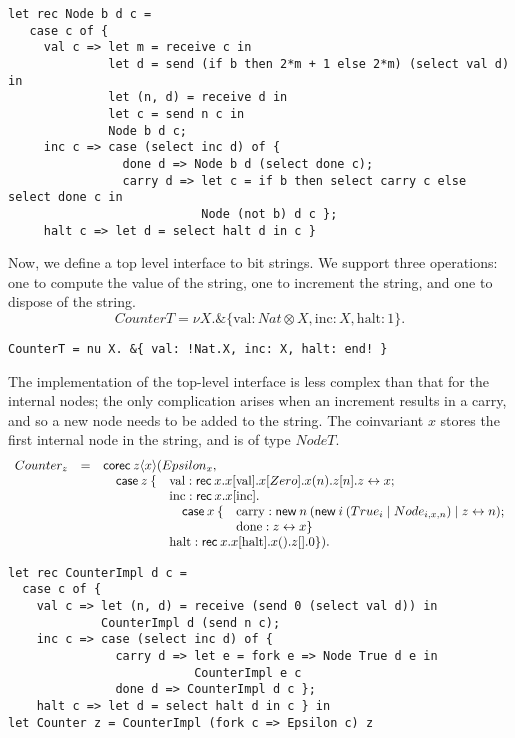 \documentclass[orivec,envcountsame]{llncs}
\newcommand{\with}{\mathbin\binampersand}
\newcommand{\mkwd}[1]{\mathsf{#1}}
\newcommand{\link}[2]{#1 \leftrightarrow #2}
\newcommand{\cut}[4]{\mkwd{new}\:#1 \: (#3 \mid #4)}
\newcommand{\rec}[1]{\mkwd{rec}\:#1}
\newcommand{\clabel}[1]{\mathrm{#1}}
\newcommand{\sel}[2]{#1[\clabel{#2}]}
\begin{document}
\begin{verbatim}
let rec Node b d c =
   case c of {
     val c => let m = receive c in
              let d = send (if b then 2*m + 1 else 2*m) (select val d) in
              let (n, d) = receive d in
              let c = send n c in
              Node b d c;
     inc c => case (select inc d) of {
                done d => Node b d (select done c);
                carry d => let c = if b then select carry c else select done c in
                           Node (not b) d c };
     halt c => let d = select halt d in c }
\end{verbatim}

Now, we define a top level interface to bit strings.  We support three operations: one to compute
the value of the string, one to increment the string, and one to dispose of the string.
%
{\small\[
 CounterT = \nu X. \with \{ \clabel{val}: Nat \otimes X, \clabel{inc}:X, \clabel{halt}:1 \}.
\]}

\begin{verbatim}
CounterT = nu X. &{ val: !Nat.X, inc: X, halt: end! }
\end{verbatim}

The implementation of the top-level interface is less complex than that for the internal nodes; the
only complication arises when an increment results in a carry, and so a new node needs to be added
to the string.  The coinvariant $x$ stores the first internal node in the string, and is of type
$NodeT$.
%
{\small\[\begin{array}{rclll}
  Counter_z & = & \multicolumn{3}{l}{\mkwd{corec}\:z \langle x \rangle (Epsilon_x,} \\
  & & \quad \mkwd{case}\:z\:\{ &\multicolumn{2}{l}{\clabel{val}: \rec{x}.\sel{x}{val}.x[Zero].x(n).z[n].\link{z}{x};} \\
  & & &  \multicolumn{2}{l}{\clabel{inc}: \rec{x}.\sel{x}{inc}.} \\
  & & & \quad \mkwd{case}\:x\:\{ &\clabel{carry}: \cut{n}{CImp}{\cut{i}{Bool}{True_i}{Node_{i,x,n}}}{\link{z}{n}}; \\
  & & & &\clabel{done}: \link{z}{x} \} \\
  & & &\multicolumn{2}{l}{\clabel{halt}:\rec{x}.\sel{x}{halt}.x().z[].0 \}).}
\end{array}\]}

\begin{verbatim}
let rec CounterImpl d c =
  case c of {
    val c => let (n, d) = receive (send 0 (select val d)) in
             CounterImpl d (send n c);
    inc c => case (select inc d) of {
               carry d => let e = fork e => Node True d e in
                          CounterImpl e c
               done d => CounterImpl d c };
    halt c => let d = select halt d in c } in
let Counter z = CounterImpl (fork c => Epsilon c) z
\end{verbatim}
\end{document}
